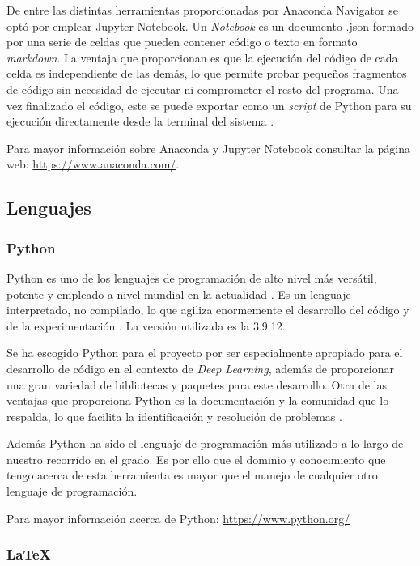 De entre las distintas herramientas proporcionadas por Anaconda Navigator se optó por emplear Jupyter Notebook. Un \textit{Notebook} es un documento .json formado por una serie de celdas que pueden contener código o texto en formato \textit{markdown}. La ventaja que proporcionan es que la ejecución del código de cada celda es independiente de las demás, lo que permite probar pequeños fragmentos de código sin necesidad de ejecutar ni comprometer el resto del programa. Una vez finalizado el código, este se puede exportar como un \textit{script} de Python para su ejecución directamente desde la terminal del sistema \cite{met:paper_anaconda}.

Para mayor información sobre Anaconda y Jupyter Notebook consultar la página web: \url{https://www.anaconda.com/}.

\subsection{Lenguajes}

\subsubsection{Python}

Python es uno de los lenguajes de programación de alto nivel más versátil, potente y empleado a nivel mundial en la actualidad \cite{met:demanded}. Es un lenguaje interpretado, no compilado, lo que agiliza enormemente el desarrollo del código y de la experimentación \cite{met:deepl_py}. La versión utilizada es la 3.9.12.

Se ha escogido Python para el proyecto por ser especialmente apropiado para el desarrollo de código en el contexto de \textit{Deep Learning}, además de proporcionar una gran variedad de bibliotecas y paquetes para este desarrollo. Otra de las ventajas que proporciona Python es la documentación y la comunidad que lo respalda, lo que facilita la identificación y resolución de problemas \cite{met:deepl_py}. 

Además Python ha sido el lenguaje de programación más utilizado a lo largo de nuestro recorrido en el grado. Es por ello que el dominio y conocimiento que tengo acerca de esta herramienta es mayor que el manejo de cualquier otro lenguaje de programación.

Para mayor información acerca de Python: \url{https://www.python.org/}

\subsubsection{\LaTeX}

